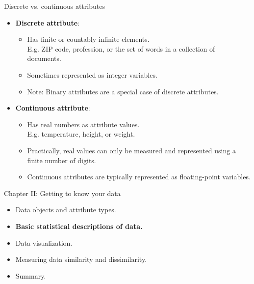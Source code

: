 \documentclass[aspectratio=169,t]{beamer}
\begin{document}
  { 
    \begin{frame}{Discrete vs. continuous attributes }
    \begin{itemize}
        \item \textbf{Discrete attribute}:
              \begin{itemize}
                  \item Has finite or countably infinite elements.\\
                        E.g. ZIP code, profession, or the set of words in a collection of documents.
                  \item Sometimes represented as integer variables.
                  \item Note: Binary attributes are a special case of discrete attributes.
              \end{itemize}
        \item \textbf{Continuous attribute}:
            \begin{itemize}
                \item Has real numbers as attribute values.\\
                      E.g. temperature, height, or weight.
                \item Practically, real values can only be measured and represented using a finite number of digits.
                \item Continuous attributes are typically represented as floating-point variables.
            \end{itemize}
        \end{itemize}
    \end{frame}
  }

  { 
    \begin{frame}{Chapter II: Getting to know your data}
        \begin{itemize}
            \item Data objects and attribute types.
            \item \textbf{Basic statistical descriptions of data.}
            \item Data visualization.
            \item Measuring data similarity and dissimilarity.
            \item Summary.
        \end{itemize}
    \end{frame}
  }
\end{document}

